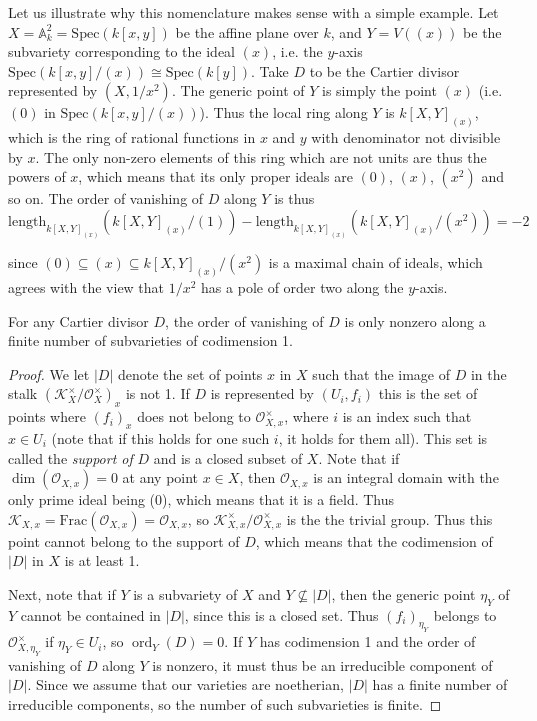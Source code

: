 \documentclass[a4paper,openany]{scrbook}
\DeclareMathOperator{\ord}{ord}
\begin{document}
\begin{example}
Let us illustrate why this nomenclature makes sense with a simple example. Let $X=\mathbb{A}_k^2=\mathrm{Spec}(k[x,y])$ be the affine plane over $k$, and $Y=V((x))$ be the subvariety corresponding to the ideal $(x)$, i.e. the $y$-axis $\mathrm{Spec}(k[x,y]/(x))\cong\mathrm{Spec}(k[y])$. Take $D$ to be the Cartier divisor represented by $(X,1/x^2)$. The generic point of $Y$ is simply the point $(x)$ (i.e. $(0)$ in $\mathrm{Spec}(k[x,y]/(x))$). Thus the local ring along $Y$ is $k[X,Y]_{(x)}$, which is the ring of rational functions in $x$ and $y$ with denominator not divisible by $x$. The only non-zero elements of this ring which are not units are thus the powers of $x$, which means that its only proper ideals are $(0)$, $(x)$, $(x^2)$ and so on. The order of vanishing of $D$ along $Y$ is thus
$$\mathrm{length}_{k[X,Y]_{(x)}}(k[X,Y]_{(x)}/(1))-\mathrm{length}_{k[X,Y]_{(x)}}(k[X,Y]_{(x)}/(x^2))=-2$$
\end{example}
since $(0)\subseteq(x)\subseteq k[X,Y]_{(x)}/(x^2)$ is a maximal chain of ideals, which agrees with the view that $1/x^2$ has a pole of order two along the $y$-axis.

\begin{prop}
For any Cartier divisor $D$, the order of vanishing of $D$ is only nonzero along a finite number of subvarieties of codimension 1.
\end{prop} 

\begin{proof}
We let $|D|$ denote the set of points $x$ in $X$ such that the image of $D$ in the stalk $(\mathcal{K}_X^\times/\mathcal{O}_X^\times)_x$ is not 1. If $D$ is represented by $(U_i,f_i)$ this is the set of points where $(f_i)_x$ does not belong to $\mathcal{O}_{X,x}^\times$, where $i$ is an index such that $x\in U_i$ (note that if this holds for one such $i$, it holds for them all). This set is called the \textit{support of} $D$ and is a closed subset of $X$. Note that if $\dim(\mathcal{O}_{X,x})=0$ at any point $x\in X$, then $\mathcal{O}_{X,x}$ is an integral domain with the only prime ideal being (0), which means that it is a field. Thus $\mathcal{K}_{X,x}=\mathrm{Frac}(\mathcal{O}_{X,x})=\mathcal{O}_{X,x}$, so $\mathcal{K}_{X,x}^\times/\mathcal{O}_{X,x}^\times$ is the the trivial group. Thus this point cannot belong to the support of $D$, which means that the codimension of $|D|$ in $X$ is at least 1.

Next, note that if $Y$ is a subvariety of $X$ and $Y\not\subseteq|D|$, then the generic point $\eta_Y$ of $Y$ cannot be contained in $|D|$, since this is a closed set. Thus $(f_i)_{\eta_Y}$ belongs to $\mathcal{O}_{X,\eta_Y}^\times$ if $\eta_Y\in U_i$, so $\ord_Y(D)=0$. If $Y$ has codimension 1 and the order of vanishing of $D$ along $Y$ is nonzero, it must thus be an irreducible component of $|D|$. Since we assume that our varieties are noetherian, $|D|$ has a finite number of irreducible components, so the number of such subvarieties is finite.
\end{proof}
\end{document}
